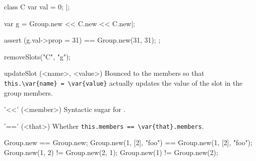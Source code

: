 \begin{urbiscriptapi}
\begin{urbiscript}
class C
{
  var val = 0;
}|;

var g = Group.new << C.new << C.new|;

assert
{
  (g.val->prop = 31) == Group.new(31, 31);
};
\end{urbiscript}
\begin{urbicomment}
  removeSlots("C", "g");
\end{urbicomment}

\item[updateSlot](<name>, <value>)%
  Bounced to the members so that
  \lstinline|this.\var{name} = \var{value}|
  actually updates the value of the slot  in
  the group members.

\item['<<'](<member>)%
  Syntactic sugar for .

\item['=='](<that>)%
  Whether \lstinline|this.members == \var{that}.members|.
\begin{urbiassert}
               Group.new == Group.new;
Group.new(1, [2], "foo") == Group.new(1, [2], "foo");
         Group.new(1, 2) != Group.new(2, 1);
            Group.new(1) != Group.new(2);
\end{urbiassert}
\end{urbiscriptapi}

